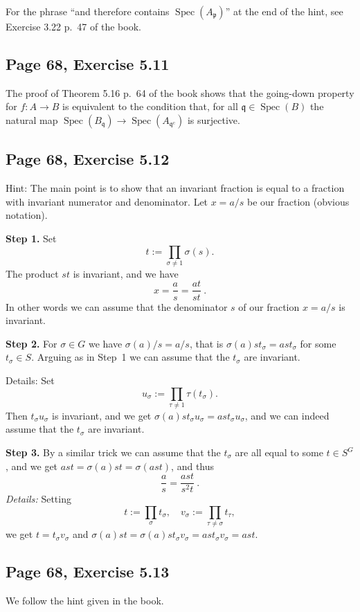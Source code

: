 \documentclass[parskip=half,fontsize=12pt]{scrartcl}%
\newcommand{\oo}{\operatorname}\newcommand{\ooo}{\operatorname*}
\newcommand{\mf}{\mathfrak}
\newcommand{\ppp}{\mf p}
\newcommand{\qqq}{\mf q}
\newcommand{\Spec}{\operatorname{Spec}}\newcommand{\Sp}{\operatorname{Spec}}
\begin{document}
For the phrase ``and therefore contains $\Spec(A_\ppp)$'' at the end of the hint, see Exercise 3.22 p.~47 of the book.

\subsection{Page 68, Exercise 5.11}%

The proof of Theorem 5.16 p.~64 of the book shows that the going-down property for $f:A\to B$ is equivalent to the condition that, for all $\qqq\in\Spec(B)$ the natural map $\Spec(B_\qqq)\to\Spec(A_{\qqq^{\oo c}})$ is surjective. 

\subsection{Page 68, Exercise 5.12}%

Hint: The main point is to show that an invariant fraction is equal to a fraction with invariant numerator and denominator. Let $x=a/s$ be our fraction (obvious notation). 

\textbf{Step 1.} Set 
$$
t:=\prod_{\sigma\ne1}\sigma(s).
$$ 
The product $st$ is invariant, and we have 
$$
x=\frac{a}{s}=\frac{at}{st}\ .
$$ 
In other words we can assume that the denominator $s$ of our fraction $x=a/s$ is invariant.

\textbf{Step 2.} For $\sigma\in G$ we have $\sigma(a)/s=a/s$, that is $\sigma(a)st_\sigma=ast_\sigma$ for some $t_\sigma\in S$. Arguing as in Step~1 we can assume that the $t_\sigma$ are invariant. 

Details: Set 
$$
u_\sigma:=\prod_{\tau\ne1}\tau(t_\sigma).
$$ 
Then $t_\sigma u_\sigma$ is invariant, and we get $\sigma(a)st_\sigma u_\sigma=ast_\sigma u_\sigma$, and we can indeed assume that the $t_\sigma$ are invariant.

\textbf{Step 3.} By a similar trick we can assume that the $t_\sigma$ are all equal to some $t\in S^G$, and we get $ast=\sigma(a)st=\sigma(ast)$, and thus 
$$
\frac{a}{s}=\frac{ast}{s^2t}\ .
$$ 
\emph{Details:} Setting 
$$
t:=\prod_\sigma t_\sigma,\quad v_\sigma:=\prod_{\tau\ne\sigma}t_\tau,
$$ 
we get $t=t_\sigma v_\sigma$ and $\sigma(a)st=\sigma(a)st_\sigma v_\sigma=ast_\sigma v_\sigma=ast$.

\subsection{Page 68, Exercise 5.13}%

We follow the hint given in the book.
\end{document}
